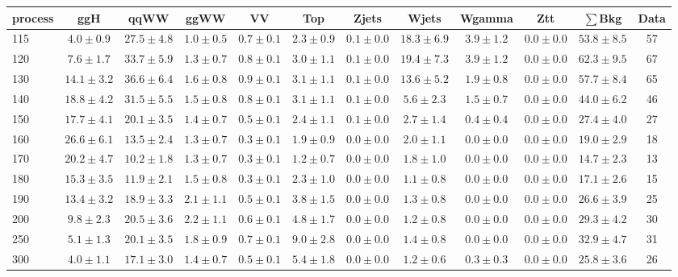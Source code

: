 \begin{table}[!hb]
{\footnotesize
 \begin{center}
 \begin{tabular}{l c c c c c c c c c c c }
 \hline
 process & ggH & qqWW & ggWW & VV & Top & Zjets & Wjets & Wgamma & Ztt & $\sum$Bkg & Data \\
 \hline
115 & $4.0\pm0.9$ & $27.5\pm4.8$ & $1.0\pm0.5$ & $0.7\pm0.1$ & $2.3\pm0.9$ & $0.1\pm0.0$ & $18.3\pm6.9$ & $3.9\pm1.2$ & $0.0\pm0.0$ & $53.8\pm8.5$ & 57 \\
120 & $7.6\pm1.7$ & $33.7\pm5.9$ & $1.3\pm0.7$ & $0.8\pm0.1$ & $3.0\pm1.1$ & $0.1\pm0.0$ & $19.4\pm7.3$ & $3.9\pm1.2$ & $0.0\pm0.0$ & $62.3\pm9.5$ & 67 \\
130 & $14.1\pm3.2$ & $36.6\pm6.4$ & $1.6\pm0.8$ & $0.9\pm0.1$ & $3.1\pm1.1$ & $0.1\pm0.0$ & $13.6\pm5.2$ & $1.9\pm0.8$ & $0.0\pm0.0$ & $57.7\pm8.4$ & 65 \\
140 & $18.8\pm4.2$ & $31.5\pm5.5$ & $1.5\pm0.8$ & $0.8\pm0.1$ & $3.1\pm1.1$ & $0.1\pm0.0$ & $5.6\pm2.3$ & $1.5\pm0.7$ & $0.0\pm0.0$ & $44.0\pm6.2$ & 46 \\
150 & $17.7\pm4.1$ & $20.1\pm3.5$ & $1.4\pm0.7$ & $0.5\pm0.1$ & $2.4\pm1.1$ & $0.1\pm0.0$ & $2.7\pm1.4$ & $0.4\pm0.4$ & $0.0\pm0.0$ & $27.4\pm4.0$ & 27 \\
160 & $26.6\pm6.1$ & $13.5\pm2.4$ & $1.3\pm0.7$ & $0.3\pm0.1$ & $1.9\pm0.9$ & $0.0\pm0.0$ & $2.0\pm1.1$ & $0.0\pm0.0$ & $0.0\pm0.0$ & $19.0\pm2.9$ & 18 \\
170 & $20.2\pm4.7$ & $10.2\pm1.8$ & $1.3\pm0.7$ & $0.3\pm0.1$ & $1.2\pm0.7$ & $0.0\pm0.0$ & $1.8\pm1.0$ & $0.0\pm0.0$ & $0.0\pm0.0$ & $14.7\pm2.3$ & 13 \\
180 & $15.3\pm3.5$ & $11.9\pm2.1$ & $1.5\pm0.8$ & $0.3\pm0.1$ & $2.3\pm1.0$ & $0.0\pm0.0$ & $1.1\pm0.8$ & $0.0\pm0.0$ & $0.0\pm0.0$ & $17.1\pm2.6$ & 15 \\
190 & $13.4\pm3.2$ & $18.9\pm3.3$ & $2.1\pm1.1$ & $0.5\pm0.1$ & $3.8\pm1.5$ & $0.0\pm0.0$ & $1.3\pm0.8$ & $0.0\pm0.0$ & $0.0\pm0.0$ & $26.6\pm3.9$ & 25 \\
200 & $9.8\pm2.3$ & $20.5\pm3.6$ & $2.2\pm1.1$ & $0.6\pm0.1$ & $4.8\pm1.7$ & $0.0\pm0.0$ & $1.2\pm0.8$ & $0.0\pm0.0$ & $0.0\pm0.0$ & $29.3\pm4.2$ & 30 \\
250 & $5.1\pm1.3$ & $20.1\pm3.5$ & $1.8\pm0.9$ & $0.7\pm0.1$ & $9.0\pm2.8$ & $0.0\pm0.0$ & $1.4\pm0.8$ & $0.0\pm0.0$ & $0.0\pm0.0$ & $32.9\pm4.7$ & 31 \\
300 & $4.0\pm1.1$ & $17.1\pm3.0$ & $1.4\pm0.7$ & $0.5\pm0.1$ & $5.4\pm1.8$ & $0.0\pm0.0$ & $1.2\pm0.6$ & $0.3\pm0.3$ & $0.0\pm0.0$ & $25.8\pm3.6$ & 26 \\

\end{tabular}
\end{center}}
\end{table}
